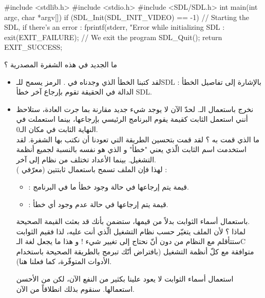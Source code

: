 \begin{Csource}
#include <stdlib.h>
#include <stdio.h>
#include <SDL/SDL.h>
int main(int argc, char *argv[])
{
	if (SDL_Init(SDL_INIT_VIDEO) == -1) // Starting the SDL, if there's an error :
	{
		fprintf(stderr, "Error while initializing SDL : %
		exit(EXIT_FAILURE); // We exit the program
	}
	SDL_Quit();
	return EXIT_SUCCESS;
}
\end{Csource}

ما الجديد في هذه الشفرة المصدرية ؟

\begin{itemize}
	\item لقد كتبنا الخطأ الذي وجدناه في
	.
	الرمز 
	يسمح للـ\textenglish{SDL} 
	بالإشارة إلى تفاصيل الخطأ : الدالة 
	في الحقيقة تقوم بإرجاع آخر خطأ
	\textenglish{SDL}.
	\item نخرج باستعمال الـ.
	لحدّ الآن لا يوجد شيء جديد مقارنة بما جرت العادة، ستلاحظ أنني استعمل الثابت 
	كقيمة يقوم البرنامج الرئيسي بإرجاعها، بينما استعملت في النهاية الثابت 
	في مكان الـ0.\\
	ما الذي قمت به ؟ لقد قمت بتحسين الطريقة التي تعودنا أن نكتب بها الشفرة. لقد استخدمت اسم الثابت الّذي يعني "خطأ" و الذي هو نفسه بالنسبة لجميع أنظمة التشغيل. بينما الأعداد تختلف من نظام إلى آخر.\\
	لهذا فإن الملف
	تسمح باستعمال ثابتتين (معرّفي 
	) :
	
	\begin{itemize}
		\item {} :
		قيمة يتم إرجاعها في حالة وجود خطأ ما في البرنامج.
		\item {} :
		قيمة يتم إرجاعها في حالة عدم وجود أي خطأ.
	\end{itemize}
	
	باستعمال أسماء الثوابت بدلاً من قيمها، ستضمن بأنك قد بعثت القيمة الصحيحة.\\
	لماذا ؟ لأن الملف
	يتغيّر حسب نظام التشغيل الّذي أنت عليه، لذا فقيم الثوابت ستتأقلم مع النظام من دون أنّ نحتاج إلى تغيير شيء !  و هذا ما يجعل لغة الـ\textenglish{C}
	متوافقة مع كلّ أنظمة التشغيل (بافتراض أنّك تبرمج بالطريقة الصحيحة باستخدام الأدوات المتوفّرة، كما فعلنا هنا).

\begin{information}
	استعمال أسماء الثوابت لا يعود علينا بكثير من النفع الآن، لكن من الأحسن استعمالها. سنقوم بذلك انطلاقاً من الآن.
\end{information}
\end{itemize}

